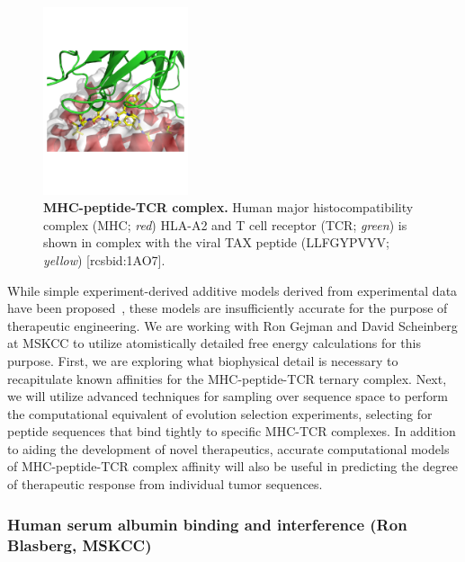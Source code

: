 \documentclass[10pt]{article}
\begin{document}
\begin{figure}
\vspace{-2.6cm}
\includegraphics[width=0.38\textwidth]{figures/1AO7.pdf}
\vspace{-2.5cm}
\caption{\footnotesize \label{figure:mhc-peptide-tcr} {\bf MHC-peptide-TCR complex.}
Human major histocompatibility complex (MHC; \emph{red}) HLA-A2 and T cell receptor (TCR; \emph{green}) is shown in complex with the viral TAX peptide (LLFGYPVYV; \emph{yellow}) [rcsbid:1AO7].}
\end{figure}

While simple experiment-derived additive models derived from experimental data have been proposed~\cite{Birnbaum:2014:Cell}, these models are insufficiently accurate for the purpose of therapeutic engineering.
We are working with Ron Gejman and David Scheinberg at MSKCC to utilize atomistically detailed free energy calculations for this purpose.
First, we are exploring what biophysical detail is necessary to recapitulate known affinities for the MHC-peptide-TCR ternary complex.
Next, we will utilize advanced techniques for sampling over sequence space to perform the computational equivalent of evolution selection experiments, selecting for peptide sequences that bind tightly to specific MHC-TCR complexes.
In addition to aiding the development of novel therapeutics, accurate computational models of MHC-peptide-TCR complex affinity will also be useful in predicting the degree of therapeutic response from individual tumor sequences.

\vspace{-0.3cm}
\subsubsection*{Human serum albumin binding and interference (Ron Blasberg, MSKCC)}
\vspace{-0.3cm}
\end{document}

